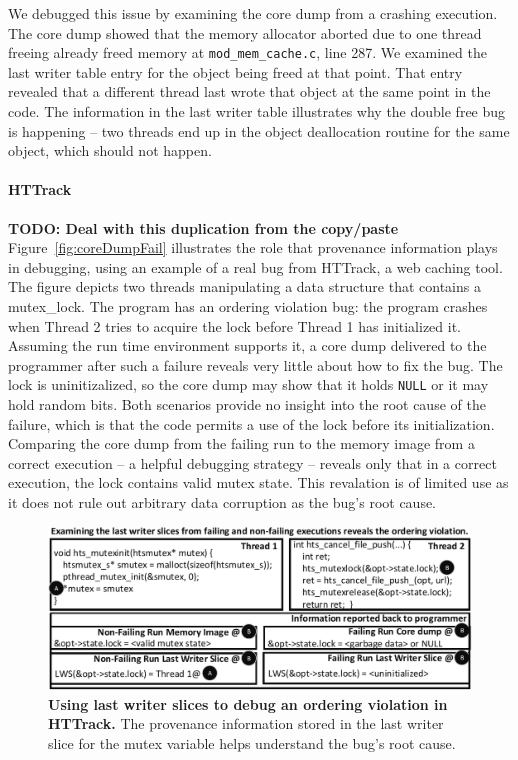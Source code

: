 \documentclass[preprint,9pt]{sigplanconf}
\begin{document}
We debugged this issue by examining the core dump from a crashing execution.
The core dump showed that the memory allocator aborted due to one thread
freeing already freed memory at {\tt mod\_mem\_cache.c}, line 287.  We examined
the last writer table entry for the object being freed at that point.  That
entry revealed that a different thread last wrote that object at the same point
in the code.  The information in the last writer table illustrates why the
double free bug is happening -- two threads end up in the object deallocation
routine for the same object, which should not happen.


\paragraph{HTTrack}
{\bf TODO: Deal with this duplication from the copy/paste}
Figure~\ref{fig:coreDumpFail} illustrates the role that provenance information
plays in debugging, using an example of a real bug from HTTrack, a web caching
tool.  The figure depicts two threads manipulating a data structure that
contains a mutex\_lock.  The program has an ordering violation bug: the
program crashes when Thread 2 tries to acquire the lock before Thread 1 has
initialized it.  Assuming the run time environment supports it, a core dump
delivered to the programmer after such a failure reveals very little about how
to fix the bug.  The lock is uninitizalized, so the core dump may show that it
holds {\tt NULL} or it may hold random bits.  Both scenarios provide no
insight into the root cause of the failure, which is that the code permits a
use of the lock before its initialization.   Comparing the core dump from the
failing run to the memory image from a correct execution -- a helpful debugging
strategy -- reveals only that in a correct execution, the lock contains valid
mutex state.  This revalation is of limited use as it does not rule out
arbitrary data corruption as the bug's root cause.

\begin{figure}[h]
\centering
\includegraphics[width=\columnwidth]{figs/LWSHTTDebug.pdf}
\caption{\label{fig:httlws}{\bf Using last writer slices to debug an
ordering violation in HTTrack.} The provenance information stored in the last
writer slice for the mutex variable helps understand the bug's root cause.}
\end{figure}
\end{document}

